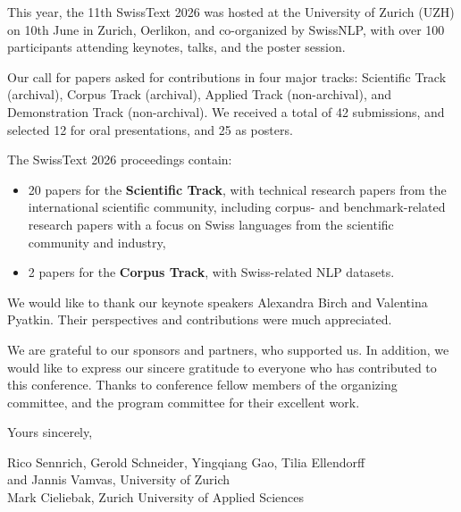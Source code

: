 This year, the 11th SwissText 2026 was hosted at the University of Zurich (UZH) on 10th June in Zurich, Oerlikon, and co-organized by SwissNLP, with over 100 participants attending keynotes, talks, and the poster session.

\medskip
 
Our call for papers asked for contributions in four major tracks: Scientific Track (archival), Corpus Track (archival), Applied Track (non-archival), and Demonstration Track (non-archival). We received a total of 42 submissions, and selected 12 for oral presentations, and 25 as posters. 

\medskip

 The SwissText 2026 proceedings contain:
 \begin{itemize}
     \item 20 papers for the \textbf{Scientific Track}, with technical research papers from the international scientific community, including corpus- and benchmark-related research papers with a focus on Swiss languages from the scientific community and industry,
     \item 2 papers for the \textbf{Corpus Track}, with Swiss-related NLP datasets. 
 \end{itemize}  
 
 We would like to thank our keynote speakers Alexandra Birch and Valentina Pyatkin. Their perspectives and contributions were much appreciated.

 \medskip
 
 We are grateful to our sponsors and partners, who supported us. In addition, we would like to express our sincere gratitude to everyone who has contributed to this conference. Thanks to conference fellow members of the organizing committee, and the program committee for their excellent work.

 \medskip
  
 Yours sincerely,\\

 \medskip

 \begin{flushright}
 Rico Sennrich, Gerold Schneider, Yingqiang Gao, Tilia Ellendorff\\and Jannis Vamvas, University of Zurich \\[0.3cm]
  Mark Cieliebak, Zurich University of Applied Sciences
  \end{flushright}
